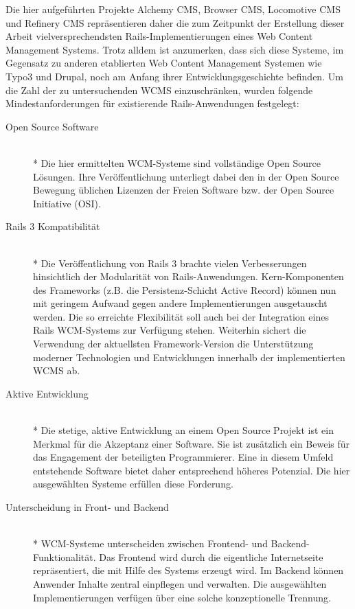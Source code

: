Die hier aufgeführten Projekte Alchemy CMS, Browser CMS, Locomotive CMS und Refinery CMS repräsentieren daher die zum Zeitpunkt der Erstellung dieser Arbeit vielversprechendsten Rails-Implementierungen eines Web Content Management Systems. Trotz alldem ist anzumerken, dass sich diese Systeme, im Gegensatz zu anderen etablierten Web Content Management Systemen wie Typo3 und Drupal, noch am Anfang ihrer Entwicklungsgeschichte befinden.
\newline
\newline
Um die Zahl der zu untersuchenden WCMS einzuschränken, wurden folgende Mindestanforderungen für existierende Rails-Anwendungen festgelegt:
\begin{description}
\item[Open Source Software]\mbox{~}\\*
Die hier ermittelten WCM-Systeme sind vollständige Open Source Lösungen. Ihre Veröffentlichung unterliegt dabei den in der Open Source Bewegung üblichen Lizenzen der Freien Software bzw. der Open Source Initiative (OSI).
\item[Rails 3 Kompatibilität]\mbox{~}\\*
Die Veröffentlichung von Rails 3 brachte vielen Verbesserungen hinsichtlich der Modularität von Rails-Anwendungen. Kern-Komponenten des Frameworks (z.B. die Persistenz-Schicht Active Record) können nun mit geringem Aufwand gegen andere Implementierungen ausgetauscht werden. Die so erreichte Flexibilität soll auch bei der Integration eines Rails WCM-Systems zur Verfügung stehen.	Weiterhin sichert die Verwendung der aktuellsten Framework-Version die 	Unterstützung moderner Technologien und Entwicklungen innerhalb der implementierten WCMS ab.
\item[Aktive Entwicklung]\mbox{~}\\*
Die stetige, aktive Entwicklung an einem Open Source Projekt ist ein Merkmal für die Akzeptanz einer Software. Sie ist zusätzlich ein Beweis für das Engagement der beteiligten Programmierer. Eine in diesem Umfeld entstehende Software bietet daher entsprechend höheres Potenzial. Die  hier ausgewählten Systeme erfüllen diese Forderung.
\newpage
\item[Unterscheidung in Front- und Backend]\mbox{~}\\*
WCM-Systeme unterscheiden zwischen Frontend- und Backend-Funktionalität. Das Frontend wird durch die eigentliche Internetseite repräsentiert, die mit Hilfe des Systems erzeugt wird. Im Backend können Anwender Inhalte zentral einpflegen und verwalten.
Die ausgewählten Implementierungen verfügen über eine solche konzeptionelle Trennung.
\end{description}

